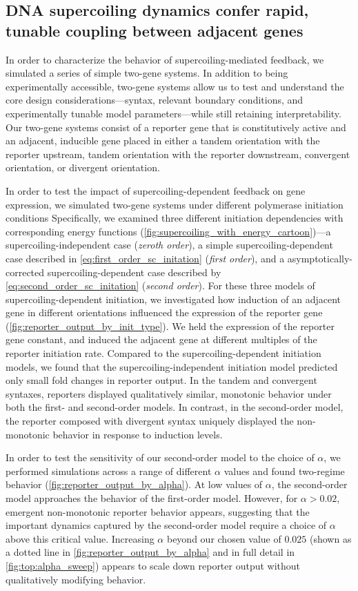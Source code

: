 \documentclass[11pt]{article}
\begin{document}
\subsection{DNA supercoiling dynamics confer rapid, tunable coupling between adjacent genes}
In order to characterize the behavior of supercoiling-mediated feedback, we simulated a series of simple two-gene systems. In addition to being experimentally accessible, two-gene systems allow us to test and understand the core design considerations---syntax, relevant boundary conditions, and experimentally tunable model parameters---while still retaining interpretability. Our two-gene systems consist of a reporter gene that is constitutively active and an adjacent, inducible gene placed in either a tandem orientation with the reporter upstream, tandem orientation with the reporter downstream, convergent orientation, or divergent orientation.

In order to test the impact of supercoiling-dependent feedback on gene expression, we simulated two-gene systems under different polymerase initiation conditions  Specifically, we examined three different initiation dependencies with corresponding energy functions (\cref{fig:supercoiling_with_energy_cartoon})---a supercoiling-independent case (\emph{zeroth order}), a simple supercoiling-dependent case described in \cref{eq:first_order_sc_initation} (\emph{first order}), and a asymptotically-corrected supercoiling-dependent case described by \cref{eq:second_order_sc_initation} (\emph{second order}).
For these three models of supercoiling-dependent initiation, we investigated how induction of an adjacent gene in different orientations influenced the expression of the reporter gene (\cref{fig:reporter_output_by_init_type}). We held the expression of the reporter gene constant, and induced the adjacent gene at different multiples of the reporter initiation rate. Compared to the supercoiling-dependent initiation models, we found that the supercoiling-independent initiation model predicted only small fold changes in reporter output. In the tandem and convergent syntaxes, reporters displayed  qualitatively similar, monotonic behavior under both the first- and second-order models. In contrast, in the second-order model, the reporter composed with divergent syntax uniquely displayed the non-monotonic behavior in response to induction levels. 

In order to test the sensitivity of our second-order model to the choice of \(\alpha\), we performed simulations across a range of different \(\alpha\) values and found two-regime behavior (\cref{fig:reporter_output_by_alpha}). At low values of \(\alpha\), the second-order model approaches the behavior of the first-order model. However, for \(\alpha > 0.02\), emergent non-monotonic reporter behavior appears, suggesting that the important dynamics captured by the second-order model require a choice of \(\alpha\) above this critical value. Increasing \(\alpha\) beyond our chosen value of \(0.025\) (shown as a dotted line in \cref{fig:reporter_output_by_alpha} and in full detail in \cref{fig:top:alpha_sweep}) appears to scale down reporter output without qualitatively modifying behavior.
\end{document}
